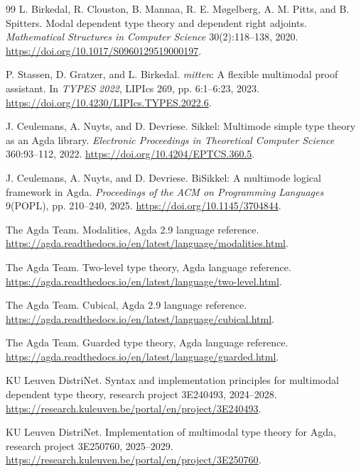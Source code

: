\documentclass[11pt]{article}
\theoremstyle{definition}
\theoremstyle{remark}
\begin{document}
\begin{thebibliography}{99}
L. Birkedal, R. Clouston, B. Mannaa, R. E. M{\o}gelberg,
  A. M. Pitts, and B. Spitters.
\newblock Modal dependent type theory and dependent right adjoints.
\newblock \emph{Mathematical Structures in Computer Science}
  30(2):118--138, 2020.
\newblock \url{https://doi.org/10.1017/S0960129519000197}.

P. Stassen, D. Gratzer, and L. Birkedal.
\newblock \emph{mitten}: A flexible multimodal proof assistant.
\newblock In \emph{TYPES 2022}, LIPIcs 269, pp. 6:1--6:23, 2023.
\newblock \url{https://doi.org/10.4230/LIPIcs.TYPES.2022.6}.

J. Ceulemans, A. Nuyts, and D. Devriese.
\newblock Sikkel: Multimode simple type theory as an Agda library.
\newblock \emph{Electronic Proceedings in Theoretical Computer Science}
  360:93--112, 2022.
\newblock \url{https://doi.org/10.4204/EPTCS.360.5}.

J. Ceulemans, A. Nuyts, and D. Devriese.
\newblock BiSikkel: A multimode logical framework in Agda.
\newblock \emph{Proceedings of the ACM on Programming Languages} 9(POPL),
  pp. 210--240, 2025.
\newblock \url{https://doi.org/10.1145/3704844}.

The Agda Team.
\newblock Modalities, Agda 2.9 language reference.
\newblock \url{https://agda.readthedocs.io/en/latest/language/modalities.html}.

The Agda Team.
\newblock Two-level type theory, Agda language reference.
\newblock \url{https://agda.readthedocs.io/en/latest/language/two-level.html}.

The Agda Team.
\newblock Cubical, Agda 2.9 language reference.
\newblock \url{https://agda.readthedocs.io/en/latest/language/cubical.html}.

The Agda Team.
\newblock Guarded type theory, Agda language reference.
\newblock \url{https://agda.readthedocs.io/en/latest/language/guarded.html}.

KU Leuven DistriNet.
\newblock Syntax and implementation principles for multimodal dependent type
  theory, research project 3E240493, 2024--2028.
\newblock \url{https://research.kuleuven.be/portal/en/project/3E240493}.

KU Leuven DistriNet.
\newblock Implementation of multimodal type theory for Agda, research project
  3E250760, 2025--2029.
\newblock \url{https://research.kuleuven.be/portal/en/project/3E250760}.


\end{thebibliography}
\end{document}
